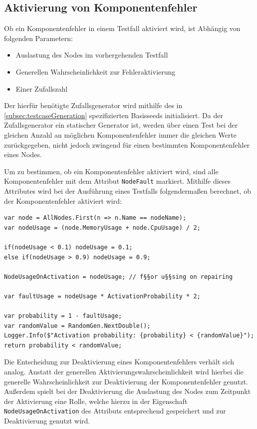 \subsection{Aktivierung von Komponentenfehler}
\label{subsec:faultActivation}

Ob ein Komponentenfehler in einem \gls{Testfall} aktiviert wird, ist Abhängig von folgenden Parametern:

\begin{itemize}
    \item Auslastung des Nodes im vorhergehenden Testfall
    \item Generellen Wahrscheinlichkeit zur Fehleraktivierung
    \item Einer Zufallszahl
\end{itemize}

Der hierfür benötigte Zufallsgenerator wird mithilfe des in \cref{subsec:testcaseGeneration} spezifizierten Basisseeds initialisiert.
Da der Zufallsgenerator ein statischer Generator ist, werden über einen \gls{Test} bei der gleichen Anzahl an möglichen Komponentenfehler immer die gleichen Werte zurückgegeben, nicht jedoch zwingend für einen bestimmten Komponentenfehler eines Nodes.

Um zu bestimmen, ob ein Komponentenfehler aktiviert wird, sind alle Komponentenfehler mit dem Attribut \texttt{NodeFault} markiert.
Mithilfe dieses Attributes wird bei der Ausführung eines Testfalls folgendermaßen berechnet, ob der Komponentenfehler aktiviert wird:

\begin{lstlisting}[label=lst:faultActivationCalc,style=cs,
caption={[Berechnung der Aktivierung von Komponentenfehlern]
    Berechnung der Aktivierung von Komponentenfehlern (zusammengefasst).}]
var node = AllNodes.First(n => n.Name == nodeName);
var nodeUsage = (node.MemoryUsage + node.CpuUsage) / 2;

if(nodeUsage < 0.1) nodeUsage = 0.1;
else if(nodeUsage > 0.9) nodeUsage = 0.9;

NodeUsageOnActivation = nodeUsage; // f§§or u§§sing on repairing

var faultUsage = nodeUsage * ActivationProbability * 2;

var probability = 1 - faultUsage;
var randomValue = RandomGen.NextDouble();
Logger.Info($"Activation probability: {probability} < {randomValue}");
return probability < randomValue;
\end{lstlisting}

Die Entscheidung zur Deaktivierung eines Komponentenfehlers verhält sich analog.
Anstatt der generellen Aktivierungswahrscheinlichkeit wird hierbei die generelle Wahrscheinlichkeit zur Deaktivierung der Komponentenfehler genutzt.
Außerdem spielt bei der Deaktivierung die Auslastung des Nodes zum Zeitpunkt der Aktivierung eine Rolle, welche hierzu in der Eigenschaft \texttt{NodeUsageOnActivation} des Attributs entsprechend gespeichert und zur Deaktivierung genutzt wird.


